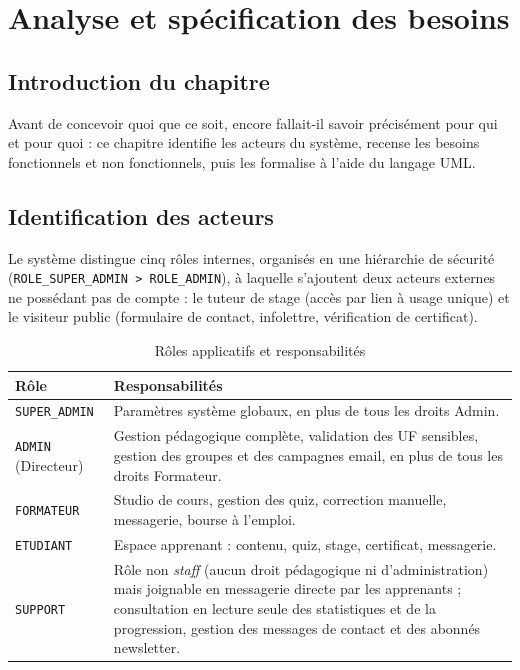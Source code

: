 \chapter{Analyse et spécification des besoins}
\label{ch:analyse-besoins}

\section*{Introduction du chapitre}
Avant de concevoir quoi que ce soit, encore fallait-il savoir précisément
pour qui et pour quoi : ce chapitre identifie les acteurs du système,
recense les besoins fonctionnels et non fonctionnels, puis les formalise
à l'aide du langage UML.

\section{Identification des acteurs}

Le système distingue cinq rôles internes, organisés en une hiérarchie de
sécurité (\texttt{ROLE\_SUPER\_ADMIN > ROLE\_ADMIN}), à laquelle s'ajoutent
deux acteurs externes ne possédant pas de compte : le tuteur de stage
(accès par lien à usage unique) et le visiteur public (formulaire de
contact, infolettre, vérification de certificat).

\begin{table}[H]
  \centering
  \caption{Rôles applicatifs et responsabilités}
  \label{tab:roles}
  \begin{tabular}{|p{2.8cm}|p{9.5cm}|}
    \toprule
    Rôle & Responsabilités \\
    \midrule
    \texttt{SUPER\_ADMIN} & Paramètres système globaux, en plus de tous les droits Admin. \\ \hline
    \texttt{ADMIN} (Directeur) & Gestion pédagogique complète, validation des UF sensibles, gestion des groupes et des campagnes email, en plus de tous les droits Formateur. \\ \hline
    \texttt{FORMATEUR} & Studio de cours, gestion des quiz, correction manuelle, messagerie, bourse à l'emploi. \\ \hline
    \texttt{ETUDIANT} & Espace apprenant : contenu, quiz, stage, certificat, messagerie. \\ \hline
    \texttt{SUPPORT} & Rôle non \emph{staff} (aucun droit pédagogique ni d'administration) mais joignable en messagerie directe par les apprenants ; consultation en lecture seule des statistiques et de la progression, gestion des messages de contact et des abonnés newsletter. \\
    \bottomrule
  \end{tabular}
\end{table}

